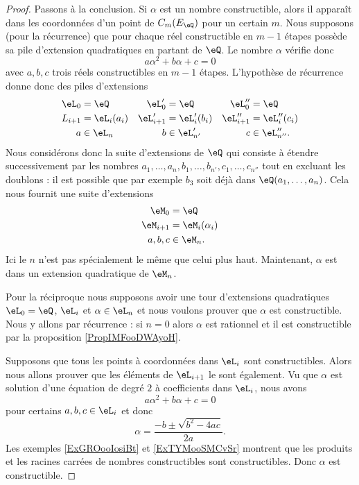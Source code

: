 \begin{proof}
    Passons à la conclusion. Si \( \alpha\) est un nombre constructible, alors il apparaît dans les coordonnées d'un point de \( C_m(E_{\eQ})\) pour un certain \( m\). Nous supposons (pour la récurrence) que pour chaque réel constructible en \( m-1\) étapes possède sa pile d'extension quadratiques en partant de \( \eQ\). Le nombre \( \alpha\) vérifie donc
    \begin{equation}
        a\alpha^2+b\alpha+c=0
    \end{equation}
    avec \( a,b,c\) trois réels constructibles en \( m-1\) étapes. L'hypothèse de récurrence donne donc des piles d'extensions
    \begin{equation}
        \begin{aligned}[]
            \eL_0&=\eQ&\eL'_0&=\eQ&\eL''_0&=\eQ\\
            L_{i+1}&=\eL_i(a_i)&\eL'_{i+1}&=\eL'_i(b_i)&\eL''_{i+1}&=\eL''_i(c_i)\\
            a&\in \eL_n&b&\in \eL'_{n'}&c&\in \eL''_{n''}.
        \end{aligned}
    \end{equation}
    Nous considérons donc la suite d'extensions de \( \eQ\) qui consiste à étendre successivement par les nombres \( a_1,\ldots, a_n,b_1,\ldots, b_{n'},c_1,\ldots, c_{n''}\) tout en excluant les doublons : il est possible que par exemple \( b_3\) soit déjà dans \( \eQ(a_1,\ldots, a_n)\). Cela nous fournit une suite d'extensions
    \begin{equation}
        \begin{aligned}[]
            \eM_0&=\eQ\\
            \eM_{i+1}&=\eM_i(\alpha_i)\\
            a,b,c&\in \eM_n.
        \end{aligned}
    \end{equation}
    Ici le \( n\) n'est pas spécialement le même que celui plus haut. Maintenant, \( \alpha\) est dans un extension quadratique de \( \eM_n\).

    Pour la réciproque nous supposons avoir une tour d'extensions quadratiques \( \eL_0=\eQ\), \( \eL_i\) et \( \alpha\in \eL_n\) et nous voulons prouver que \( \alpha\) est constructible. Nous y allons par récurrence : si \( n=0\) alors \( \alpha\) est rationnel et il est constructible par la proposition \ref{PropIMFooDWAyoH}. 

    Supposons que tous les points à coordonnées dans \( \eL_i\) sont constructibles. Alors nous allons prouver que les éléments de \( \eL_{i+1}\) le sont également. Vu que \( \alpha\) est solution d'une équation de degré \( 2\) à coefficients dans \( \eL_i\), nous avons
    \begin{equation}
        a\alpha^2+b\alpha+c=0
    \end{equation}
    pour certains \( a,b,c\in\eL_i\) et donc
    \begin{equation}
        \alpha=\frac{-b\pm\sqrt{b^2-4ac} }{ 2a }.
    \end{equation}
    Les exemples \ref{ExGROooIosiBt} et \ref{ExTYMooSMCvSr} montrent que les produits et les racines carrées de nombres constructibles sont constructibles. Donc \( \alpha\) est constructible.


\end{proof}
